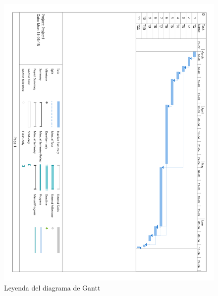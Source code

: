 \begin{figure}[!htp]
	\centering
	\includegraphics[page=2, scale=.7]{fig/gantt_diagram_simplified}
	\caption{Leyenda del diagrama de Gantt}
\end{figure}